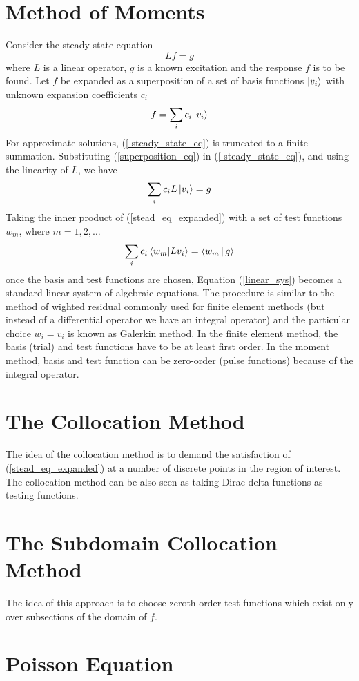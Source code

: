 \documentclass{tufte-handout}
\begin{document}
 \section{Method of Moments}
 Consider the steady state equation
 \begin{equation}\label{ steady_state_eq}
 L f = g
 \end{equation}
 where $L$ is a linear operator, $g$ is a known excitation and the response $f$ is to be found. Let $f$ be expanded as a superposition of a set of basis functions $\Ket{v_i}$ with unknown expansion coefficients $c_i$
 \begin{equation}\label{superposition_eq}
f = \sum_i c_i \Ket{v_i} 
 \end{equation}
 For approximate solutions, (\ref{ steady_state_eq}) is truncated to a finite summation. Substituting (\ref{superposition_eq}) in (\ref{ steady_state_eq}), and using the linearity of $L$, we have
 \begin{equation} \label{stead_eq_expanded}
   \sum_i c_i L \Ket{v_i} = g
 \end{equation}  
 Taking the inner product of  (\ref{stead_eq_expanded}) with a set of test functions $w_m$, where $  m = 1,2, \dots $  
 \begin{equation}\label{linear_sys}
    \sum_i c_i  \braket{w_m |L v_i} = \Braket{w_m | g}
 \end{equation}
 once the basis and test functions are chosen, Equation (\ref{linear_sys}) becomes a standard linear system of algebraic equations. The procedure is similar to  the method of wighted residual commonly used for finite element methods (but instead of a differential operator we have an integral operator) and the particular choice $w_i = v_i$ is known as Galerkin method. In the finite element method, the basis (trial) and test functions have to be at least first order. In the moment method, basis and test function can be zero-order (pulse functions) because of the integral operator. 
 \section{The Collocation Method}
 The idea of the collocation method is to demand the satisfaction of (\ref{stead_eq_expanded}) at a number of discrete points in the region of interest. The collocation method can be also seen as taking Dirac delta functions as testing functions.
 \section{The Subdomain Collocation Method}
 The idea of  this approach is to choose zeroth-order test functions which exist only over subsections of the domain of $f$.   
 \section{Poisson Equation}
\end{document}
